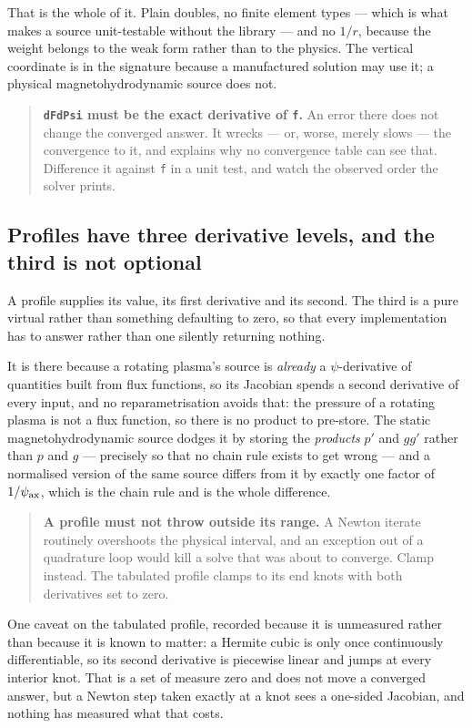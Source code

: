 That is the whole of it. Plain doubles, no finite element types --- which is what
makes a source unit-testable without the library --- and no $1/r$, because the
weight belongs to the weak form rather than to the physics. The vertical
coordinate is in the signature because a manufactured solution may use it; a
physical magnetohydrodynamic source does not.

\begin{quote}
	\textbf{\texttt{dFdPsi} must be the exact derivative of \texttt{f}.} An error
	there does not change the converged answer. It wrecks --- or, worse, merely
	slows --- the convergence to it, and  explains why no
	convergence table can see that. Difference it against \texttt{f} in a unit
	test, and watch the observed order the solver prints.
\end{quote}

\subsection{Profiles have three derivative levels, and the third is not optional}

A profile supplies its value, its first derivative and its second. The third is
a pure virtual rather than something defaulting to zero, so that every
implementation has to answer rather than one silently returning nothing.

It is there because a rotating plasma's source is \emph{already} a
$\psi$-derivative of quantities built from flux functions, so its Jacobian spends
a second derivative of every input, and no reparametrisation avoids that: the
pressure of a rotating plasma is not a flux function, so there is no product to
pre-store. The static magnetohydrodynamic source dodges it by storing the
\emph{products} $p'$ and $gg'$ rather than $p$ and $g$ --- precisely so that no
chain rule exists to get wrong --- and a normalised version of the same source
differs from it by exactly one factor of $1/\psi_{\mathrm{ax}}$, which is the chain rule and
is the whole difference.

\begin{quote}
	\textbf{A profile must not throw outside its range.} A Newton iterate
	routinely overshoots the physical interval, and an exception out of a
	quadrature loop would kill a solve that was about to converge. Clamp
	instead. The tabulated profile clamps to its end knots with both derivatives
	set to zero.
\end{quote}

One caveat on the tabulated profile, recorded because it is unmeasured rather
than because it is known to matter: a Hermite cubic is only once continuously
differentiable, so its second derivative is piecewise linear and jumps at every
interior knot. That is a set of measure zero and does not move a converged
answer, but a Newton step taken exactly at a knot sees a one-sided Jacobian, and
nothing has measured what that costs.


